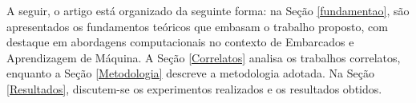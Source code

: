 A seguir, o artigo está organizado da seguinte forma: na Seção \ref{fundamentao}, são apresentados os fundamentos teóricos que embasam o trabalho proposto, com destaque em abordagens computacionais no contexto de Embarcados e Aprendizagem de Máquina. A Seção \ref{Correlatos} analisa os trabalhos correlatos, enquanto a Seção \ref{Metodologia} descreve a metodologia adotada. Na Seção \ref{Resultados}, discutem-se os experimentos realizados e os resultados obtidos.